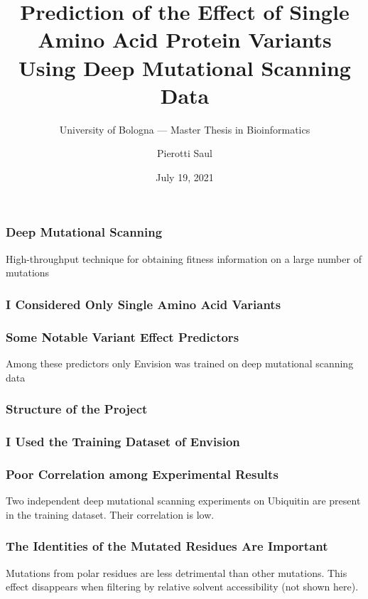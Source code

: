 \documentclass[10pt, british]{beamer}
\title[Single Aminoacid Variants Prediction]{Prediction of the Effect of Single Amino Acid Protein
	Variants\\Using Deep Mutational Scanning Data}
\subtitle[]{University of Bologna --- Master Thesis in Bioinformatics}
\author[Pierotti Saul]{Pierotti Saul}
\date{July 19, 2021}
\begin{document}
\begin{frame}[plain]
	\titlepage%
\end{frame}

\begin{frame}
	\frametitle{Deep Mutational Scanning}
	High-throughput technique for obtaining fitness information on a large number of mutations
	\vfill%
	\begin{figure}
		
	\end{figure}
\end{frame}

\begin{frame}
	\frametitle{I Considered Only Single Amino Acid Variants}
	\vfill%
	\begin{figure}
		
	\end{figure}
\end{frame}

\begin{frame}
	\frametitle{Some Notable Variant Effect Predictors}
	\begin{figure}
		
	\end{figure}
	\vfill%
	Among these predictors only Envision was trained on deep mutational scanning data
\end{frame}

\begin{frame}
	\frametitle{Structure of the Project}
	\begin{figure}
		
	\end{figure}
\end{frame}

\begin{frame}
	\frametitle{I Used the Training Dataset of Envision \parencite{Gray2018}}
	\vfill%
	\centering%
	
	
\end{frame}

\begin{frame}
	\frametitle{Poor Correlation among Experimental Results}
	Two independent deep mutational scanning experiments on Ubiquitin are present in the training dataset.
	Their correlation is low.
	\vfill%
	\centering%
	
\end{frame}

\begin{frame}
	\frametitle{The Identities of the Mutated Residues Are Important}
	Mutations from polar residues are less detrimental than other mutations.
	This effect disappears when filtering by relative solvent accessibility (not shown here).
	\vfill%
	\centering%
	
\end{frame}
\end{document}
